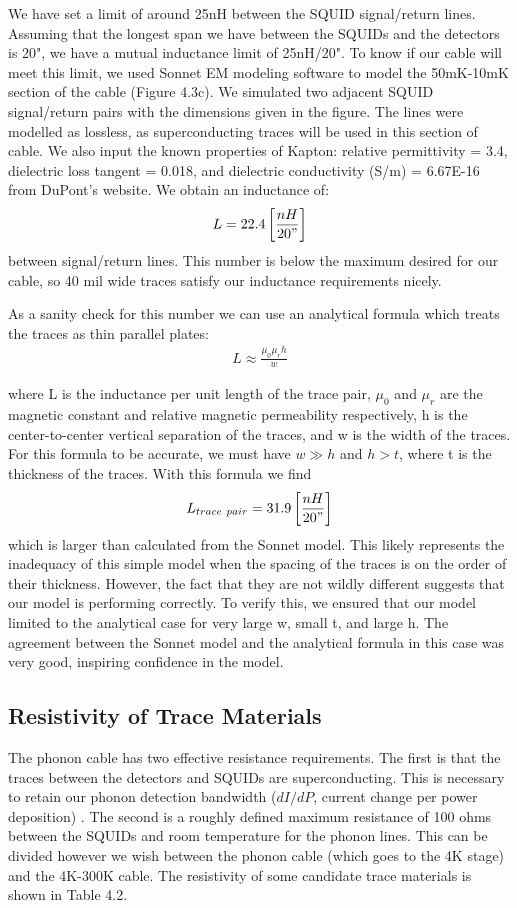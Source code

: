 \documentclass{report}
\begin{document}
We have set a limit of around 25nH between the SQUID signal/return lines. Assuming that the longest span we have between the SQUIDs and the detectors is 20", we have a mutual inductance limit of 25nH/20". To know if our cable will meet this limit, we used Sonnet EM modeling software to model the 50mK-10mK section of the cable (Figure 4.3c). We simulated two adjacent SQUID signal/return pairs with the dimensions given in the figure. The lines were modelled as lossless, as superconducting traces will be used in this section of cable. We also input the known properties of Kapton: relative permittivity = 3.4, dielectric loss tangent = 0.018, and dielectric conductivity (S/m) = 6.67E-16 from DuPont's website. We obtain an inductance of:
$$
L = 22.4\left[\frac{nH}{20"}\right]
$$
between signal/return lines. This number is below the maximum desired for our cable, so 40 mil wide traces satisfy our inductance requirements nicely.

As a sanity check for this number we can use an analytical formula which treats the traces as thin parallel plates:
\begin{eqnarray}
L \approx \frac{\mu_{0} \mu_{r} h}{w}
\end{eqnarray}

where L is the inductance per unit length of the trace pair, $\mu_{0}$ and $\mu_{r}$ are the magnetic constant and relative magnetic permeability respectively, h is the center-to-center vertical separation of the traces, and w is the width of the traces. For this formula to be accurate, we must have $w\gg h$ and $h > t$, where t is the thickness of the traces. With this formula we find
$$
L_{trace \ pair} = 31.9\left[\frac{nH}{20"}\right]
$$
which is larger than calculated from the Sonnet model. This likely represents the inadequacy of this simple model when the spacing of the traces is on the order of their thickness. However, the fact that they are not wildly different suggests that our model is performing correctly. To verify this, we ensured that our model limited to the analytical case for very large w, small t, and large h. The agreement between the Sonnet model and the analytical formula in this case was very good, inspiring confidence in the model.

\subsection{Resistivity of Trace Materials}
The phonon cable has two effective resistance requirements. The first is that the traces between the detectors and SQUIDs are superconducting. This is necessary to retain our phonon detection bandwidth ($dI/dP$, current change per power deposition) \cite{Pyle2012}. The second is a roughly defined maximum resistance of 100 ohms between the SQUIDs and room temperature for the phonon lines. This can be divided however we wish between the phonon cable (which goes to the 4K stage) and the 4K-300K cable. The resistivity of some candidate trace materials is shown in Table 4.2.
\end{document}
